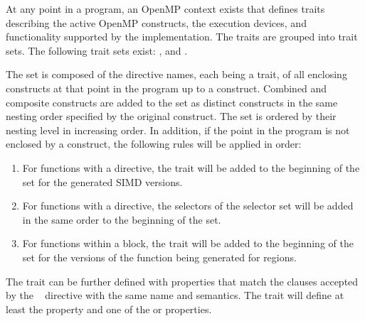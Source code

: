 At any point in a program, an OpenMP context exists that defines traits
describing the active OpenMP constructs, the execution devices, and
functionality supported by the implementation. The traits are grouped into
trait sets. The following trait sets exist: ,  and
.

The  set is composed of the directive names, each being a
trait, of all enclosing constructs at that point in the program up
to a  construct. Combined and composite constructs are added
to the set as distinct constructs in the same nesting order specified by
the original construct. The set is ordered by their nesting level in
increasing order. In addition, if the point in the program is not enclosed by
a  construct, the following rules will be applied in order:

\begin{enumerate}
 \item For functions with a  directive, the 
     trait will be added to the beginning of the set for the generated SIMD versions.
 \item For functions with a  directive, the selectors of
     the  selector set will be added in the same order to the beginning of the set.

 \item For functions within a  block, the 
     trait will be added to the beginning of the set for the versions of the function being generated for  regions.
\end{enumerate}

The  trait can be further defined with properties that match the
clauses accepted by the ~ directive with the same
name and semantics. The  trait will define at least the
 property and one of  the  or  properties.

